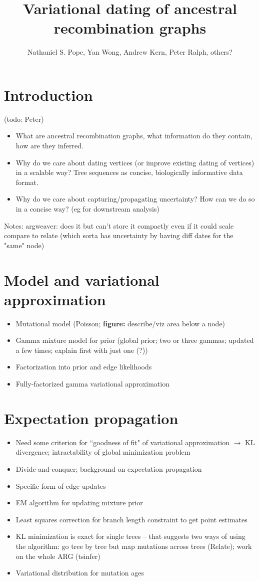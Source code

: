 \documentclass{article}
\title{Variational dating of ancestral recombination graphs}
\author{Nathaniel S. Pope, Yan Wong, Andrew Kern, Peter Ralph, others?}
\date{}
\begin{document}
\maketitle

\section{Introduction} (todo: Peter)
\begin{itemize}
\item What are ancestral recombination graphs, what information do they contain, how are they inferred.
\item Why do we care about dating vertices (or improve existing dating of vertices) in a scalable way? Tree sequences as concise, biologically informative data format. 
\item Why do we care about capturing/propagating uncertainty? How can we do so in a concise way? (eg for downstream analysis)
\end{itemize}

Notes:
argweaver: does it but can't store it compactly even if it could scale
compare to relate (which sorta has uncertainty by having diff dates for the "same" node)

\section{Model and variational approximation}
\begin{itemize}
\item Mutational model (Poisson; \textbf{figure:} describe/viz area below a node)
\item Gamma mixture model for prior (global prior; two or three gammas; updated a few times; explain first with just one (?))
\item Factorization into prior and edge likelihoods
\item Fully-factorized gamma variational approximation
\end{itemize}

\section{Expectation propagation}
\label{methods}
\begin{itemize}
\item Need some criterion for ``goodness of fit" of variational approximation $\rightarrow$ KL divergence; intractability of global minimization problem
\item Divide-and-conquer; background on expectation propagation
\item Specific form of edge updates
\item EM algorithm for updating mixture prior
\item Least squares correction for branch length constraint to get point estimates
\item KL minimization is exact for single trees -- that suggests two ways of using the algorithm: go tree by tree but map mutations across trees (Relate); work on the whole ARG (tsinfer)
\item Variational distribution for mutation ages
\end{itemize}
\end{document}
